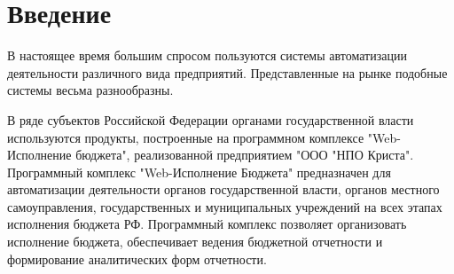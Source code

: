 \documentclass[a4paper]{extarticle}
\numberwithin{equation}{section}
\begin{document}
{\setlength{\parskip}{0cm} \tableofcontents \par}

\newpage
\section*{Введение}
В настоящее время большим спросом пользуются системы автоматизации деятельности различного вида предприятий. Представленные на рынке подобные системы весьма разнообразны.\par
В ряде субъектов Российской Федерации органами государственной власти используются продукты, построенные на программном комплексе "Web-Исполнение бюджета", реализованной предприятием "ООО "НПО Криста". Программный комплекс "Web-Исполнение Бюджета" предназначен для автоматизации деятельности органов государственной власти, органов местного самоуправления, государственных и муниципальных учреждений на всех этапах исполнения бюджета РФ. Программный комплекс позволяет организовать исполнение бюджета, обеспечивает ведения бюджетной отчетности и формирование аналитических форм отчетности.\par
\end{document}
